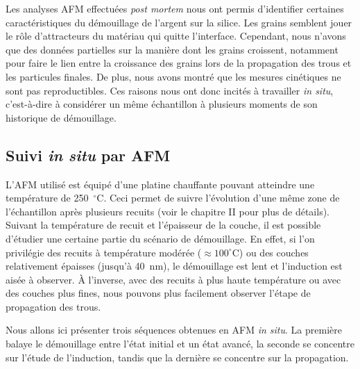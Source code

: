 Les analyses AFM effectuées \textit{post mortem} nous ont permis d'identifier certaines caractéristiques du démouillage de l'argent sur la silice. Les grains semblent jouer le rôle d'attracteurs du matériau qui quitte l'interface. Cependant, nous n'avons que des données partielles sur la manière dont les grains croissent, notamment pour faire le lien entre la croissance des grains lors de la propagation des trous et les particules finales. De plus, nous avons montré que les mesures cinétiques ne sont pas reproductibles. Ces raisons nous ont donc incités à travailler \textit{in situ}, c'est-à-dire à considérer un même échantillon à plusieurs moments de son historique de démouillage.\par

\subsection{Suivi \textit{in situ} par AFM}
\label{sAFMinSitu}
L'AFM utilisé est équipé d'une platine chauffante pouvant atteindre une température de 250~$^\circ$C. Ceci permet de suivre l'évolution d'une même zone de l'échantillon après plusieurs recuits (voir le chapitre II pour plus de détails). Suivant la température de recuit et l'épaisseur de la couche, il est possible d'étudier une certaine partie du scénario de démouillage. En effet, si l'on privilégie des recuits à température modérée ($\approx 100^\circ$C) ou des couches relativement épaisses (jusqu'à 40~nm), le démouillage est lent et l'induction est aisée à observer. À l'inverse, avec des recuits à plus haute température ou avec des couches plus fines, nous pouvons plus facilement observer l'étape de propagation des trous.\par
Nous allons ici présenter trois séquences obtenues en AFM \textit{in situ}. La première balaye le démouillage entre l'état initial et un état avancé, la seconde se concentre sur l'étude de l'induction, tandis que la dernière se concentre sur la propagation.\par

